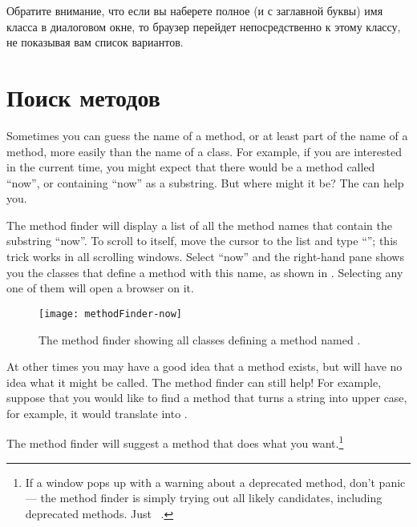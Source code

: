\documentclass[a4paper,10pt,twoside]{book}
\begin{document}
Обратите внимание, что если вы наберете полное (и с заглавной буквы)
имя класса в диалоговом окне, то браузер перейдет непосредственно 
к этому классу, не показывая вам список вариантов. 


\section{Поиск методов}

Sometimes you can guess the name of a method, or at least part of the name of a method, more easily than the name of a class.  For example, if you are interested in the current time, you might expect that there would be a method called ``now'', or containing ``now'' as a substring.   But where might it be?
The  can help you.

The method finder will display a list of all the method names that contain the substring ``now''.  
To scroll to  itself, move the cursor to the list and type ``''; this trick works in all scrolling windows.  Select ``now'' and the right-hand pane shows you the classes that define a method with this name, as shown in .  Selecting any one of them will open a browser on it.

\begin{figure}[hbt]
\centerline {\texttt{[image: methodFinder-now]}}
\caption{The method finder showing all classes defining a method named .
}
\end{figure}

At other times you may have a good idea that a method exists, but will have no idea what it might be called.
The method finder can still help!  For example, suppose that you would like to find a method that turns a string into upper case, for example, it would translate  into .

\noindent
The method finder will suggest a method that does what you want.\footnote{If a window pops up with a warning about a deprecated method, don't panic --- the method finder is simply trying out all likely candidates, including deprecated methods. Just \click ~.}
\end{document}
